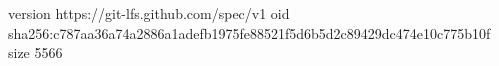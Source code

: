version https://git-lfs.github.com/spec/v1
oid sha256:c787aa36a74a2886a1adefb1975fe88521f5d6b5d2c89429dc474e10c775b10f
size 5566
